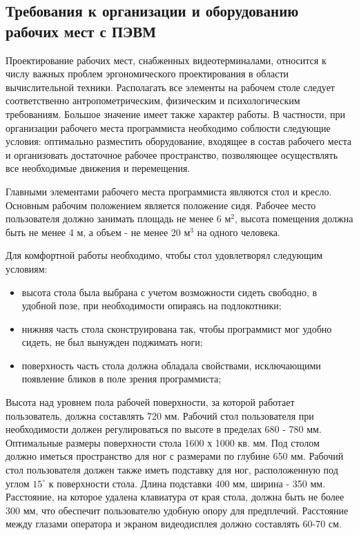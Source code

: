 \subsection{Требования к организации и оборудованию рабочих мест с ПЭВМ}
Проектирование рабочих мест, снабженных видеотерминалами, относится к числу важных проблем эргономического проектирования в области вычислительной техники. Располагать все элементы на рабочем столе следует соответственно антропометрическим, физическим и психологическим требованиям. Большое значение имеет также характер работы. В частности, при организации рабочего места программиста необходимо соблюсти следующие условия: оптимально разместить оборудование, входящее в состав рабочего места и организовать достаточное рабочее пространство, позволяющее осуществлять все необходимые движения и перемещения.

Главными элементами рабочего места программиста являются стол и кресло. Основным рабочим положением является положение сидя. Рабочее место пользователя должно занимать площадь не менее 6 $\mbox{м}^2$, высота помещения должна быть не менее  4 м, а объем - не менее 20 $\mbox{м}^3$ на одного человека.

Для комфортной работы необходимо, чтобы стол удовлетворял следующим условиям:
\begin{itemize}
	\item высота стола была выбрана с учетом возможности сидеть свободно, в удобной позе, при необходимости опираясь на подлокотники;
	\item нижняя часть стола сконструирована так, чтобы программист мог удобно сидеть, не был вынужден поджимать ноги;
	\item поверхность часть стола должна обладала свойствами, исключающими появление бликов в поле зрения программиста; 
\end{itemize}

Высота над уровнем пола рабочей  поверхности, за которой работает пользователь, должна составлять 720 мм. Рабочий стол пользователя при необходимости должен регулироваться по высоте в пределах 680 - 780 мм. Оптимальные  размеры  поверхности  стола 1600 х 1000 кв. мм. Под столом должно иметься пространство для ног с размерами по глубине 650 мм. Рабочий стол пользователя должен также иметь подставку для ног, расположенную под углом $15^\circ$ к поверхности стола. Длина подставки 400 мм, ширина - 350 мм. Расстояние, на которое удалена клавиатура от края стола, должна быть не более 300 мм, что обеспечит пользователю удобную опору для предплечий. Расстояние между глазами оператора и экраном видеодисплея должно составлять 60-70 см.

